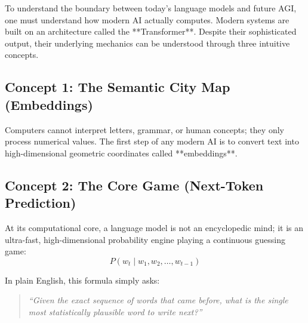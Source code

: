 \documentclass[11pt,journal,onecolumn]{IEEEtran}
\begin{document}
To understand the boundary between today's language models and future AGI, one must understand how modern AI actually computes. Modern systems are built on an architecture called the **Transformer**. Despite their sophisticated output, their underlying mechanics can be understood through three intuitive concepts.

\subsection{Concept 1: The Semantic City Map (Embeddings)}
Computers cannot interpret letters, grammar, or human concepts; they only process numerical values. The first step of any modern AI is to convert text into high-dimensional geometric coordinates called **embeddings**.

\vspace{0.4em}
\noindent{}

\subsection{Concept 2: The Core Game (Next-Token Prediction)}
At its computational core, a language model is not an encyclopedic mind; it is an ultra-fast, high-dimensional probability engine playing a continuous guessing game:
\begin{equation}
P(w_{t} \mid w_1, w_2, \dots, w_{t-1})
\end{equation}

In plain English, this formula simply asks:
\begin{quote}
\textit{``Given the exact sequence of words that came before, what is the single most statistically plausible word to write next?''}
\end{quote}
\end{document}
